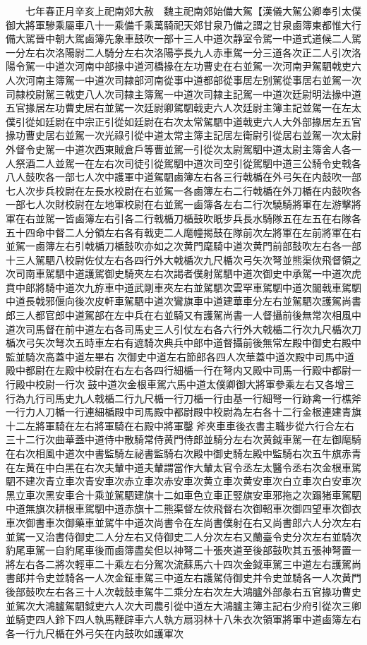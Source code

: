 　　七年春正月辛亥上祀南郊大赦　魏主祀南郊始備大駕【漢儀大駕公卿奉引太僕御大將軍驂乘屬車八十一乘備千乘萬騎祀天郊甘泉乃備之謂之甘泉鹵簿東都惟大行備大駕晉中朝大駕鹵簿先象車鼓吹一部十三人中道次静室令駕一中道式道候二人駕一分左右次洛陽尉二人騎分左右次洛陽亭長九人赤車駕一分三道各次正二人引次洛陽令駕一中道次河南中部掾中道河橋掾在左功曹史在右並駕一次河南尹駕駟戟吏六人次河南主簿駕一中道次司隸部河南從事中道都部從事居左别駕從事居右並駕一次司隸校尉駕三戟吏八人次司隸主簿駕一中道次司隸主記駕一中道次廷尉明法掾中道五官掾居左功曹史居右並駕一次廷尉卿駕駟戟吏六人次廷尉主簿主記並駕一在左太僕引從如廷尉在中宗正引從如廷尉在右次太常駕駟中道戟吏六人大外部掾居左五官掾功曹史居右並駕一次光祿引從中道太常主簿主記居左衛尉引從居右並駕一次太尉外督令史駕一中道次西東賊倉戶等曹並駕一引從次太尉駕駟中道太尉主簿舍人各一人祭酒二人並駕一在左右次司徒引從駕駟中道次司空引從駕駟中道三公騎令史戟各八人鼓吹各一部七人次中護軍中道駕駟鹵簿左右各三行戟楯在外弓矢在内鼓吹一部七人次步兵校尉在左長水校尉在右並駕一各鹵簿左右二行戟楯在外刀楯在内鼓吹各一部七人次財校尉在左地軍校尉在右並駕一鹵簿各左右二行次驍騎將軍在左游擊將軍在右並駕一皆鹵簿左右引各二行戟楯刀楯鼓吹眂步兵長水騎隊五在左五在右隊各五十四命中督二人分領左右各有戟吏二人麾幢揭鼓在隊前次左將軍在左前將軍在右並駕一鹵簿左右引戟楯刀楯鼓吹亦如之次黄門麾騎中道次黄門前部鼓吹左右各一部十三人駕駟八校尉佐仗左右各四行外大戟楯次九尺楯次弓矢次弩並熊渠佽飛督領之次司南車駕駟中道護駕御史騎夾左右次謁者僕射駕駟中道次御史中承駕一中道次虎賁中郎將騎中道次九斿車中道武剛車夾左右並駕駟次雲罕車駕駟中道次闟戟車駕駟中道長戟邪偃向後次皮軒車駕駟中道次鸞旗車中道建華車分左右並駕駟次護駕尚書郎三人都官郎中道駕部在左中兵在右並騎又有護駕尚書一人督攝前後無常次相風中道次司馬督在前中道左右各司馬史三人引仗左右各六行外大戟楯二行次九尺楯次刀楯次弓矢次弩次五時車左右有遮騎次典兵中郎中道督攝前後無常左殿中御史右殿中監並騎次高蓋中道左畢右次御史中道左右節郎各四人次華蓋中道次殿中司馬中道殿中都尉在左殿中校尉在右左右各四行細楯一行在弩内又殿中司馬一行殿中都尉一行殿中校尉一行次鼓中道次金根車駕六馬中道太僕卿御大將軍參乘左右又各增三行為九行司馬史九人戟楯二行九尺楯一行刀楯一行由基一行細弩一行跡禽一行樵斧一行力人刀楯一行連細楯殿中司馬殿中都尉殿中校尉為左右各十二行金根連建青旗十二左將軍騎在左右將軍騎在右殿中將軍鑿斧夾車車後衣書主職步從六行合左右三十二行次曲華蓋中道侍中散騎常侍黄門侍郎並騎分左右次黄鉞車駕一在左御麾騎在右次相風中道次中書監騎左祕書監騎右次殿中御史騎左殿中監騎右次五牛旗赤青在左黄在中白黑在右次夫輦中道夫輦謂當作大輦太官令丞左太醫令丞右次金根車駕駟不建次青立車次青安車次赤立車次赤安車次黄立車次黄安車次白立車次白安車次黑立車次黑安車合十乘並駕駟建旗十二如車色立車正竪旗安車邪拖之次蹋猪車駕駟中道無旗次耕根車駕駟中道赤旗十二熊渠督左佽飛督右次御軺車次御四望車次御衣車次御書車次御藥車並駕牛中道次尚書令在左尚書僕射在右又尚書郎六人分次左右並駕一又治書侍御史二人分左右又侍御史二人分次左右又蘭臺令史分次左右並騎次豹尾車駕一自豹尾車後而鹵簿盡矣但以神弩二十張夾道至後部鼓吹其五張神弩置一將左右各二將次輕車二十乘左右分駕次流蘇馬六十四次金鉞車駕三中道左右護駕尚書郎并令史並騎各一人次金鉦車駕三中道左右護駕侍御史并令史並騎各一人次黄門後部鼓吹左右各三十人次戟鼓車駕牛二乘分左右次左大鴻臚外部彖右五官掾功曹史並駕次大鴻臚駕駟鉞吏六人次大司農引從中道左大鴻臚主簿主記右少府引從次三卿並騎吏四人鈴下四人執馬鞭辟車六人執方扇羽林十八朱衣次領軍將軍中道鹵簿左右各一行九尺楯在外弓矢在内鼓吹如護軍次